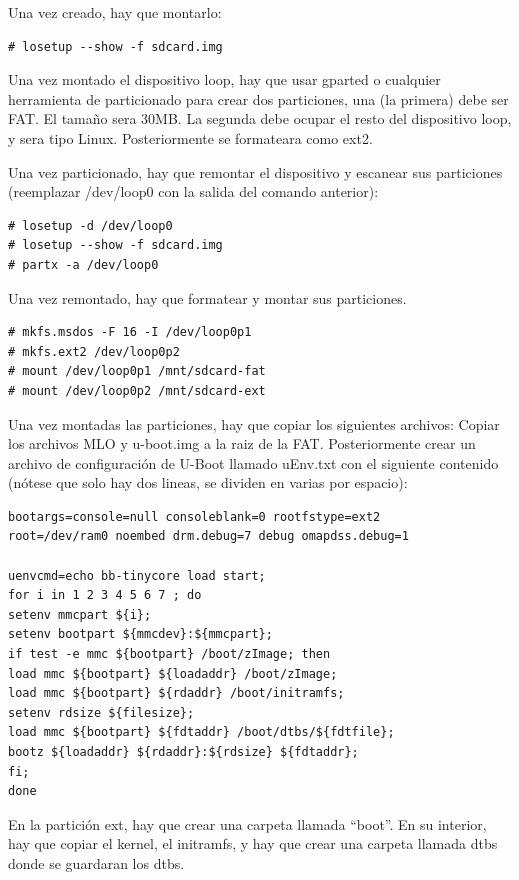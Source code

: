 \documentclass{tfg}
\begin{document}
Una vez creado, hay que montarlo:
\begin{lstlisting}[caption=Montado del dispositivo loop]
# losetup --show -f sdcard.img
\end{lstlisting}

Una vez montado el dispositivo loop, hay que usar gparted o cualquier herramienta de particionado para crear dos particiones, una (la primera) debe ser FAT. El tamaño sera 30MB. La segunda debe ocupar el resto del dispositivo loop, y sera tipo Linux. Posteriormente se formateara como ext2.

Una vez particionado, hay que remontar el dispositivo y escanear sus particiones (reemplazar /dev/loop0 con la salida del comando anterior):

\begin{lstlisting}[caption=Remontado del dispositivo loop]
# losetup -d /dev/loop0
# losetup --show -f sdcard.img
# partx -a /dev/loop0
\end{lstlisting}

Una vez remontado, hay que formatear y montar sus particiones.

\begin{lstlisting}[caption=Formateado y montado del dispositivo loop]
# mkfs.msdos -F 16 -I /dev/loop0p1
# mkfs.ext2 /dev/loop0p2
# mount /dev/loop0p1 /mnt/sdcard-fat
# mount /dev/loop0p2 /mnt/sdcard-ext
\end{lstlisting}

Una vez montadas las particiones, hay que copiar los siguientes archivos:
Copiar los archivos MLO y u-boot.img a la raiz de la FAT. Posteriormente crear un
archivo de configuración de U-Boot llamado uEnv.txt con el siguiente contenido (nótese que solo hay dos lineas, se dividen en varias por espacio):
\begin{lstlisting}[caption=uEnv.txt]
bootargs=console=null consoleblank=0 rootfstype=ext2
root=/dev/ram0 noembed drm.debug=7 debug omapdss.debug=1

uenvcmd=echo bb-tinycore load start;
for i in 1 2 3 4 5 6 7 ; do
setenv mmcpart ${i};
setenv bootpart ${mmcdev}:${mmcpart};
if test -e mmc ${bootpart} /boot/zImage; then
load mmc ${bootpart} ${loadaddr} /boot/zImage;
load mmc ${bootpart} ${rdaddr} /boot/initramfs;
setenv rdsize ${filesize};
load mmc ${bootpart} ${fdtaddr} /boot/dtbs/${fdtfile};
bootz ${loadaddr} ${rdaddr}:${rdsize} ${fdtaddr};
fi;
done
\end{lstlisting}

En la partición ext, hay que crear una carpeta llamada ``boot''. En su interior, hay que copiar el kernel, el initramfs, y hay que crear una carpeta llamada dtbs donde se guardaran los dtbs.
\end{document}
